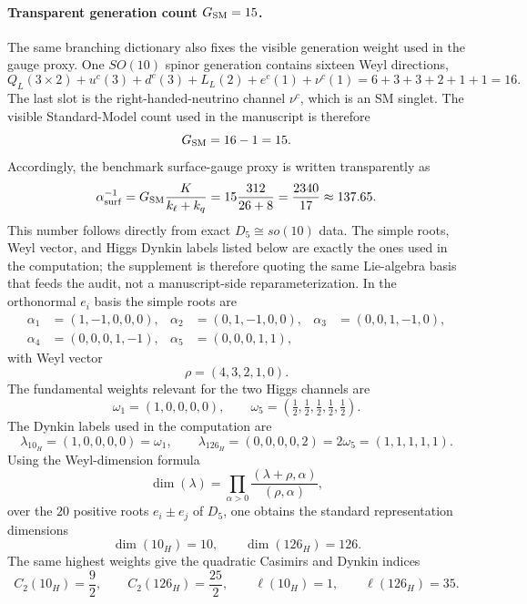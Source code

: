 \documentclass[11pt]{article}
\begin{document}
\paragraph{Transparent generation count $G_{\rm SM}=15$.}
The same branching dictionary also fixes the visible generation weight used in the gauge proxy. One $SO(10)$ spinor generation contains sixteen Weyl directions,
\begin{equation}
 Q_L(3\times2)+u^c(3)+d^c(3)+L_L(2)+e^c(1)+\nu^c(1)
 = 6+3+3+2+1+1 = 16.
\end{equation}
The last slot is the right-handed-neutrino channel $\nu^c$, which is an SM singlet. The visible Standard-Model count used in the manuscript is therefore
\begin{equation}
 G_{\rm SM}=16-1=15.
\end{equation}
Accordingly, the benchmark surface-gauge proxy is written transparently as
\begin{equation}
 \alpha^{-1}_{\rm surf}
 =
 G_{\rm SM}\frac{K}{k_{\ell}+k_q}
 =
 15\frac{312}{26+8}
 =
 \frac{2340}{17}
 \approx 137.65.
\end{equation}
This number follows directly from exact $D_5\cong so(10)$ data. The simple roots, Weyl vector, and Higgs Dynkin labels listed below are exactly the ones used in the computation; the supplement is therefore quoting the same Lie-algebra basis that feeds the audit, not a manuscript-side reparameterization. In the orthonormal $e_i$ basis the simple roots are
\begin{align}
 \alpha_1&=(1,-1,0,0,0), &
 \alpha_2&=(0,1,-1,0,0), &
 \alpha_3&=(0,0,1,-1,0), \\
 \alpha_4&=(0,0,0,1,-1), &
 \alpha_5&=(0,0,0,1,1),
\end{align}
with Weyl vector
\begin{equation}
 \rho=(4,3,2,1,0).
\end{equation}
The fundamental weights relevant for the two Higgs channels are
\begin{equation}
 \omega_1=(1,0,0,0,0),
 \qquad
 \omega_5=\left(\tfrac12,\tfrac12,\tfrac12,\tfrac12,\tfrac12\right).
\end{equation}
The Dynkin labels used in the computation are
\begin{equation}
 \lambda_{10_H}=(1,0,0,0,0)=\omega_1,
 \qquad
 \lambda_{126_H}=(0,0,0,0,2)=2\omega_5=(1,1,1,1,1).
\end{equation}
Using the Weyl-dimension formula
\begin{equation}
 \dim(\lambda)=\prod_{\alpha>0}\frac{(\lambda+\rho,\alpha)}{(\rho,\alpha)},
\end{equation}
over the $20$ positive roots $e_i\pm e_j$ of $D_5$, one obtains the standard representation dimensions
\begin{equation}
 \dim(10_H)=10,
 \qquad
 \dim(126_H)=126.
\end{equation}
The same highest weights give the quadratic Casimirs and Dynkin indices
\begin{equation}
 C_2(10_H)=\frac92,
 \qquad
 C_2(126_H)=\frac{25}{2},
 \qquad
 \ell(10_H)=1,
 \qquad
 \ell(126_H)=35.
\end{equation}
\end{document}
